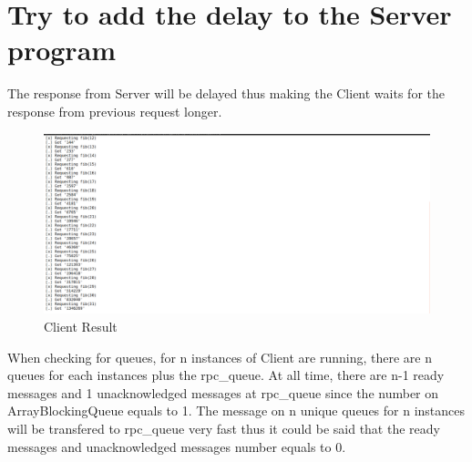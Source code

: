 \documentclass[11pt,a4paper]{report}
\begin{document}
	\section{Try to add the delay to the Server program}
	The response from Server will be delayed thus making the Client waits for the response from previous request longer.\newpage
	\begin{figure}[t]
  		\includegraphics[width=\linewidth]{res-client.png}
  		\caption{Client Result}
  		\label{fig:res-client}
	\end{figure}
	When checking for queues, for n instances of Client are running, there are n queues for each instances plus the rpc\_queue. At all time, there are n-1 ready messages and 1 unacknowledged messages at rpc\_queue since the number on ArrayBlockingQueue equals to 1. The message on n unique queues for n instances will be transfered to rpc\_queue very fast thus it could be said that the ready messages and unacknowledged messages number equals to 0.
\end{document}
